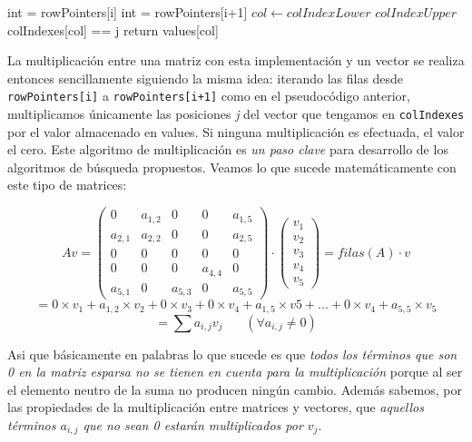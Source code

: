 	\vspace{\baselineskip}
	\begin{codebox}
	\li int  = rowPointers[i]
	\li int  = rowPointers[i+1]
	\li \For $col \gets colIndexLower$ \To $colIndexUpper$ \Do
	\li \If  colIndexes[col] == j
	\li \Then return values[col]
	\End
	\End
	\End
	\end{codebox} 
	\vspace{\baselineskip}
	
	La multiplicación entre una matriz con esta implementación y un vector se realiza entonces sencillamente siguiendo la misma idea: iterando las filas desde \texttt{rowPointers[i]} a \texttt{rowPointers[i+1]} como en el pseudocódigo anterior, multiplicamos únicamente las posiciones \textit{j} del vector que tengamos en \texttt{colIndexes} por el valor almacenado en values. Si ninguna multiplicación es efectuada, el valor el cero. Este algoritmo de multiplicación es \textit{un paso clave} para desarrollo de los algoritmos de búsqueda propuestos. Veamos lo que sucede matemáticamente con este tipo de matrices: 

\vspace{\baselineskip}

\[	Av =
	 \begin{pmatrix}
	 0 & a_{1,2} & 0 & 0 & a_{1,5} \\
	 a_{2,1} & a_{2,2} & 0 & 0 & a_{2,5} \\
	 0 & 0 & 0 & 0 & 0 \\
	 0 & 0 & 0 & a_{4,4} & 0 \\
	 a_{5,1} & 0 & a_{5,3} & 0 & a_{5,5}
	 \end{pmatrix}
	 \cdot
	 \begin{pmatrix}
	 v_1 \\
	 v_2 \\
	 v_3 \\
	 v_4 \\
	 v_5 
	 \end{pmatrix}
	  = filas(A) \cdot v
\]
\vspace{2 pt}
\[
	= 0 \times v_1 + a_{1,2} \times v_2 + 0 \times v_3 + 0 \times v_4 + a_{1,5} \times v5 + ... + 0 \times v_4 + a_{5,5} \times v_5
\]
\vspace{2 pt}
\[
    = \sum a_{i,j} v_j  \ \ \ \ \ \ \ \ (\forall a_{i,j} \neq 0)
\]
\vspace{5 pt}

\par
Asi que básicamente en palabras lo que sucede es que \textit{todos los términos que son 0 en la matriz esparsa no se tienen en cuenta para la multiplicación} porque al ser el elemento neutro de la suma no producen ningún cambio. Además sabemos, por las propiedades de la multiplicación entre matrices y vectores, que \textit{aquellos términos $a_{i,j}$ que no sean 0 estarán multiplicados por $v_j$}. 

